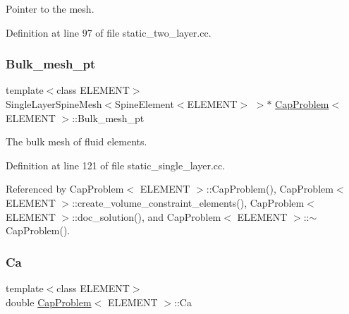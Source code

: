 Pointer to the mesh. 



Definition at line 97 of file static\+\_\+two\+\_\+layer.\+cc.

\mbox{\label{classCapProblem_a6d74594a707d89fc3fd5b87bf1c26a5b}} 
\subsubsection{\texorpdfstring{Bulk\+\_\+mesh\+\_\+pt}{Bulk\_mesh\_pt}\hspace{0.1cm}{\footnotesize\ttfamily [2/2]}}
{\footnotesize\ttfamily template$<$class E\+L\+E\+M\+E\+NT$>$ \\
Single\+Layer\+Spine\+Mesh$<$Spine\+Element$<$E\+L\+E\+M\+E\+NT$>$ $>$$\ast$ \hyperlink{classCapProblem}{Cap\+Problem}$<$ E\+L\+E\+M\+E\+NT $>$\+::Bulk\+\_\+mesh\+\_\+pt\hspace{0.3cm}{\ttfamily [private]}}



The bulk mesh of fluid elements. 



Definition at line 121 of file static\+\_\+single\+\_\+layer.\+cc.



Referenced by Cap\+Problem$<$ E\+L\+E\+M\+E\+N\+T $>$\+::\+Cap\+Problem(), Cap\+Problem$<$ E\+L\+E\+M\+E\+N\+T $>$\+::create\+\_\+volume\+\_\+constraint\+\_\+elements(), Cap\+Problem$<$ E\+L\+E\+M\+E\+N\+T $>$\+::doc\+\_\+solution(), and Cap\+Problem$<$ E\+L\+E\+M\+E\+N\+T $>$\+::$\sim$\+Cap\+Problem().

\mbox{\label{classCapProblem_ad856df0aa70d881a2b2bc81ad4e2e251}} 
\subsubsection{\texorpdfstring{Ca}{Ca}}
{\footnotesize\ttfamily template$<$class E\+L\+E\+M\+E\+NT$>$ \\
double \hyperlink{classCapProblem}{Cap\+Problem}$<$ E\+L\+E\+M\+E\+NT $>$\+::Ca\hspace{0.3cm}{\ttfamily [private]}}



